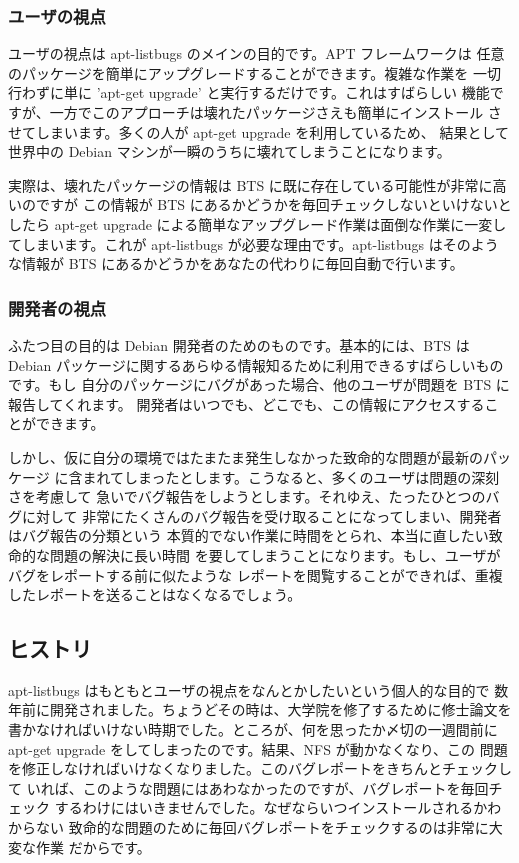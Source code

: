 \documentclass[mingoth,a4paper]{jsarticle}
\begin{document}
\subsubsection{ユーザの視点}

ユーザの視点は apt-listbugs のメインの目的です。APT フレームワークは
任意のパッケージを簡単にアップグレードすることができます。複雑な作業を
一切行わずに単に 'apt-get upgrade' と実行するだけです。これはすばらしい
機能ですが、一方でこのアプローチは壊れたパッケージさえも簡単にインストール
させてしまいます。多くの人が apt-get upgrade を利用しているため、
結果として世界中の Debian マシンが一瞬のうちに壊れてしまうことになります。

実際は、壊れたパッケージの情報は BTS に既に存在している可能性が非常に高いのですが
この情報が BTS にあるかどうかを毎回チェックしないといけないとしたら apt-get upgrade
による簡単なアップグレード作業は面倒な作業に一変してしまいます。これが
apt-listbugs が必要な理由です。apt-listbugs はそのような情報が BTS
にあるかどうかをあなたの代わりに毎回自動で行います。

\subsubsection{開発者の視点}

ふたつ目の目的は Debian 開発者のためのものです。基本的には、BTS は Debian
パッケージに関するあらゆる情報知るために利用できるすばらしいものです。もし
自分のパッケージにバグがあった場合、他のユーザが問題を BTS に報告してくれます。
開発者はいつでも、どこでも、この情報にアクセスすることができます。

しかし、仮に自分の環境ではたまたま発生しなかった致命的な問題が最新のパッケージ
に含まれてしまったとします。こうなると、多くのユーザは問題の深刻さを考慮して
急いでバグ報告をしようとします。それゆえ、たったひとつのバグに対して
非常にたくさんのバグ報告を受け取ることになってしまい、開発者はバグ報告の分類という
本質的でない作業に時間をとられ、本当に直したい致命的な問題の解決に長い時間
を要してしまうことになります。もし、ユーザがバグをレポートする前に似たような
レポートを閲覧することができれば、重複したレポートを送ることはなくなるでしょう。

\subsection{ヒストリ}

apt-listbugs はもともとユーザの視点をなんとかしたいという個人的な目的で
数年前に開発されました。ちょうどその時は、大学院を修了するために修士論文を
書かなければいけない時期でした。ところが、何を思ったか〆切の一週間前に
apt-get upgrade をしてしまったのです。結果、NFS が動かなくなり、この
問題を修正しなければいけなくなりました。このバグレポートをきちんとチェックして
いれば、このような問題にはあわなかったのですが、バグレポートを毎回チェック
するわけにはいきませんでした。なぜならいつインストールされるかわからない
致命的な問題のために毎回バグレポートをチェックするのは非常に大変な作業
だからです。
\end{document}
